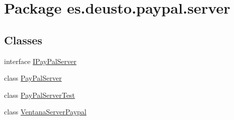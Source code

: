 \hypertarget{namespacees_1_1deusto_1_1paypal_1_1server}{}\section{Package es.\+deusto.\+paypal.\+server}
\label{namespacees_1_1deusto_1_1paypal_1_1server}
\subsection*{Classes}
\begin{DoxyCompactItemize}
\item 
interface \mbox{\hyperlink{interfacees_1_1deusto_1_1paypal_1_1server_1_1_i_pay_pal_server}{I\+Pay\+Pal\+Server}}
\item 
class \mbox{\hyperlink{classes_1_1deusto_1_1paypal_1_1server_1_1_pay_pal_server}{Pay\+Pal\+Server}}
\item 
class \mbox{\hyperlink{classes_1_1deusto_1_1paypal_1_1server_1_1_pay_pal_server_test}{Pay\+Pal\+Server\+Test}}
\item 
class \mbox{\hyperlink{classes_1_1deusto_1_1paypal_1_1server_1_1_ventana_server_paypal}{Ventana\+Server\+Paypal}}
\end{DoxyCompactItemize}
